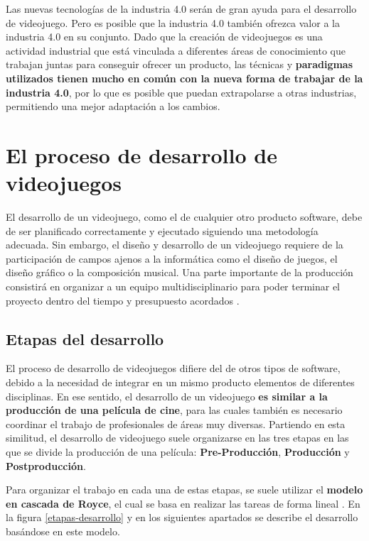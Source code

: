 Las nuevas tecnologías de la industria 4.0 serán de gran ayuda para el desarrollo de videojuego. Pero es posible que la industria 4.0 también ofrezca valor a la industria 4.0 en su conjunto. Dado que la creación de videojuegos es una actividad industrial que está vinculada a diferentes áreas de conocimiento que trabajan juntas para conseguir ofrecer un producto, las técnicas y \textbf{paradigmas utilizados tienen mucho en común con la nueva forma de trabajar de la industria 4.0}, por lo que es posible que puedan extrapolarse a otras industrias, permitiendo una mejor adaptación a los cambios.

\section{El proceso de desarrollo de videojuegos}
El desarrollo de un videojuego, como el de cualquier otro producto software, debe de ser planificado correctamente y ejecutado siguiendo una metodología adecuada. Sin embargo, el diseño y desarrollo de un videojuego requiere de la participación de campos ajenos a la informática como el diseño de juegos, el diseño gráfico o la composición musical. Una parte importante de la producción consistirá en organizar a un equipo multidisciplinario para poder terminar el proyecto dentro del tiempo y presupuesto acordados \cite{libro_esi}.

\subsection{Etapas del desarrollo}
El proceso de desarrollo de videojuegos difiere del de otros tipos de software, debido a la necesidad de integrar en un mismo producto elementos de diferentes disciplinas. En ese sentido, el desarrollo de un videojuego \textbf{es similar a la producción de una película de cine}, para las cuales también es necesario coordinar el trabajo de profesionales de áreas muy diversas. Partiendo en esta similitud, el desarrollo de videojuego suele organizarse en las tres etapas en las que se divide la producción de una película: \textbf{Pre-Producción}, \textbf{Producción} y \textbf{Postproducción}.

Para organizar el trabajo en cada una de estas etapas, se suele utilizar el \textbf{modelo en cascada de Royce}, el cual se basa en realizar las tareas de forma lineal \cite{libro_esi}. En la figura \ref{etapas-desarrollo} y en los siguientes apartados se describe el desarrollo basándose en este modelo. 


